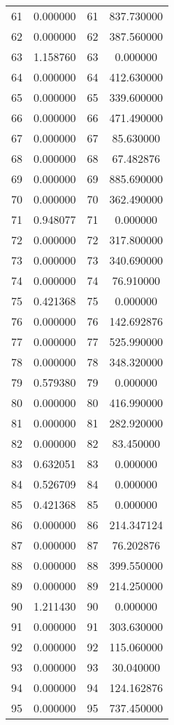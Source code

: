 \documentclass[12pt]{article}
\begin{document}
\begin{longtable}{@{}cccc@{}}
61 & 0.000000 & 61 & 837.730000 \\
62 & 0.000000 & 62 & 387.560000 \\
63 & 1.158760 & 63 & 0.000000 \\
64 & 0.000000 & 64 & 412.630000 \\
65 & 0.000000 & 65 & 339.600000 \\
66 & 0.000000 & 66 & 471.490000 \\
67 & 0.000000 & 67 & 85.630000 \\
68 & 0.000000 & 68 & 67.482876 \\
69 & 0.000000 & 69 & 885.690000 \\
70 & 0.000000 & 70 & 362.490000 \\
71 & 0.948077 & 71 & 0.000000 \\
72 & 0.000000 & 72 & 317.800000 \\
73 & 0.000000 & 73 & 340.690000 \\
74 & 0.000000 & 74 & 76.910000 \\
75 & 0.421368 & 75 & 0.000000 \\
76 & 0.000000 & 76 & 142.692876 \\
77 & 0.000000 & 77 & 525.990000 \\
78 & 0.000000 & 78 & 348.320000 \\
79 & 0.579380 & 79 & 0.000000 \\
80 & 0.000000 & 80 & 416.990000 \\
81 & 0.000000 & 81 & 282.920000 \\
82 & 0.000000 & 82 & 83.450000 \\
83 & 0.632051 & 83 & 0.000000 \\
84 & 0.526709 & 84 & 0.000000 \\
85 & 0.421368 & 85 & 0.000000 \\
86 & 0.000000 & 86 & 214.347124 \\
87 & 0.000000 & 87 & 76.202876 \\
88 & 0.000000 & 88 & 399.550000 \\
89 & 0.000000 & 89 & 214.250000 \\
90 & 1.211430 & 90 & 0.000000 \\
91 & 0.000000 & 91 & 303.630000 \\
92 & 0.000000 & 92 & 115.060000 \\
93 & 0.000000 & 93 & 30.040000 \\
94 & 0.000000 & 94 & 124.162876 \\
95 & 0.000000 & 95 & 737.450000 \\

\end{longtable}
\end{document}
